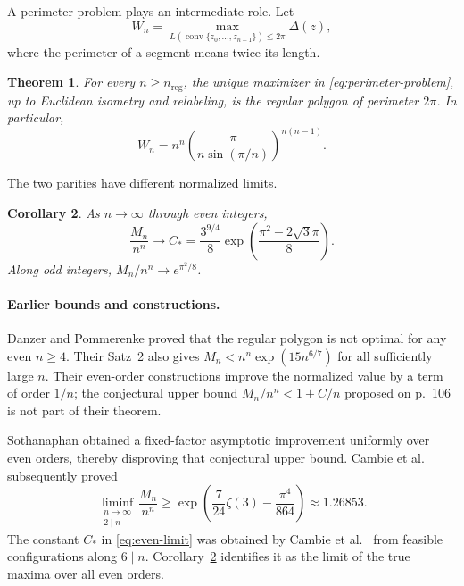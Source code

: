 \documentclass[11pt,reqno]{amsart}
\numberwithin{equation}{section}
\newtheorem{theorem}{Theorem}[section]
\newtheorem{corollary}[theorem]{Corollary}
\theoremstyle{definition}
\theoremstyle{remark}
\DeclareMathOperator{\conv}{conv}
\begin{document}
A perimeter problem plays an intermediate role. Let
\begin{equation}\label{eq:perimeter-problem}
 W_n=\max_{L(\conv\{z_0,\ldots,z_{n-1}\})\le2\pi}\Delta(z),
\end{equation}
where the perimeter of a segment means twice its length.

\begin{theorem}\label{thm:perimeter}
For every $n\ge n_{\mathrm{reg}}$, the unique maximizer in \eqref{eq:perimeter-problem}, up to Euclidean isometry and relabeling, is the regular polygon of perimeter $2\pi$. In particular,
\begin{equation}\label{eq:perimeter-exact}
 W_n=n^n\left(\frac{\pi}{n\sin(\pi/n)}\right)^{n(n-1)}.
\end{equation}
\end{theorem}

The two parities have different normalized limits.
\begin{corollary}\label{thm:limits}
As $n\to\infty$ through even integers,
\begin{equation}\label{eq:even-limit}
 \frac{M_n}{n^n}\longrightarrow C_*
 =\frac{3^{9/4}}8\exp\left(\frac{\pi^2-2\sqrt3\pi}{8}\right).
\end{equation}
Along odd integers, $M_n/n^n\to e^{\pi^2/8}$.
\end{corollary}

\paragraph{Earlier bounds and constructions.}
Danzer and Pommerenke \cite[Satz~1 and the remark on pp.~101--103]{danzer-pommerenke} proved that the regular polygon is not optimal for any even $n\ge4$. Their Satz~2 also gives $M_n<n^n\exp(15n^{6/7})$ for all sufficiently large $n$. Their even-order constructions improve the normalized value by a term of order $1/n$; the conjectural upper bound $M_n/n^n<1+C/n$ proposed on p.~106 is not part of their theorem.

Sothanaphan \cite[Proposition~1]{sothanaphan} obtained a fixed-factor asymptotic improvement uniformly over even orders, thereby disproving that conjectural upper bound. Cambie et al.\ \cite[Theorem~3]{cambie} subsequently proved
\[
 \liminf_{\substack{n\to\infty\\2\mid n}}\frac{M_n}{n^n}
 \ge \exp\left(\frac7{24}\zeta(3)-\frac{\pi^4}{864}\right)
 \approx1.26853.
\]
The constant $C_*$ in \eqref{eq:even-limit} was obtained by Cambie et al.\ \cite[Theorem~2]{cambie} from feasible configurations along $6\mid n$. Corollary~\ref{thm:limits} identifies it as the limit of the true maxima over all even orders.
\end{document}
